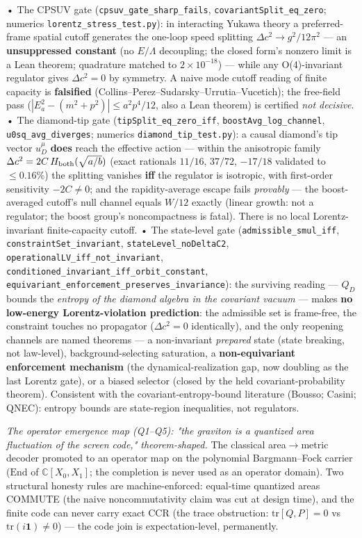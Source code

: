 \documentclass[11pt,a4paper]{article}
\begin{document}
  • The CPSUV gate (\texttt{cpsuv\_gate\_sharp\_fails}, \texttt{covariantSplit\_eq\_zero}; numerics \texttt{lorentz\_stress\_test.py}): in interacting Yukawa theory a preferred-frame spatial cutoff generates the one-loop speed splitting $\Delta c^2\to g^2/12\pi^2$ — an \textbf{unsuppressed constant} (no $E/\Lambda$ decoupling; the closed form's nonzero limit is a Lean theorem; quadrature matched to $2\times10^{-18}$) — while any O(4)-invariant regulator gives $\Delta c^2=0$ by symmetry. A naive mode cutoff reading of finite capacity is \textbf{falsified} (Collins--Perez--Sudarsky--Urrutia--Vucetich); the free-field pass ($|E_a^2-(m^2+p^2)|\le a^2p^4/12$, also a Lean theorem) is certified \emph{not decisive}.
  • The diamond-tip gate (\texttt{tipSplit\_eq\_zero\_iff}, \texttt{boostAvg\_log\_channel}, \texttt{u0sq\_avg\_diverges}; numerics \texttt{diamond\_tip\_test.py}): a causal diamond's tip vector $u^\mu_D$ \textbf{does} reach the effective action — within the anisotropic family $\Delta c^2=2C\,H_{\rm both}(\sqrt{a/b})$ (exact rationals $11/16$, $37/72$, $-17/18$ validated to $\le0.16\%$) the splitting vanishes \textbf{iff} the regulator is isotropic, with first-order sensitivity $-2C\ne0$; and the rapidity-average escape fails \emph{provably} — the boost-averaged cutoff's null channel equals $W/12$ exactly (linear growth: not a regulator; the boost group's noncompactness is fatal). There is no local Lorentz-invariant finite-capacity cutoff.
  • The state-level gate (\texttt{admissible\_smul\_iff}, \texttt{constraintSet\_invariant}, \texttt{stateLevel\_noDeltaC2}, \texttt{operationalLV\_iff\_not\_invariant}, \texttt{conditioned\_invariant\_iff\_orbit\_constant}, \texttt{equivariant\_enforcement\_preserves\_invariance}): the surviving reading — $Q_D$ bounds the \emph{entropy of the diamond algebra in the covariant vacuum} — makes \textbf{no low-energy Lorentz-violation prediction}: the admissible set is frame-free, the constraint touches no propagator ($\Delta c^2=0$ identically), and the only reopening channels are named theorems — a non-invariant \emph{prepared} state (state breaking, not law-level), background-selecting saturation, a \textbf{non-equivariant enforcement mechanism} (the dynamical-realization gap, now doubling as the last Lorentz gate), or a biased selector (closed by the held covariant-probability theorem). Consistent with the covariant-entropy-bound literature (Bousso; Casini; QNEC): entropy bounds are state-region inequalities, not regulators.

\emph{The operator emergence map (Q1--Q5): "the graviton is a quantized area fluctuation of the screen code," theorem-shaped.} The classical area$\to$metric decoder promoted to an operator map on the polynomial Bargmann--Fock carrier ($\mathrm{End}$ of $\mathbb{C}[X_0,X_1]$; the completion is never used as an operator domain). Two structural honesty rules are machine-enforced: equal-time quantized areas COMMUTE (the naive noncommutativity claim was cut at design time), and the finite code can never carry exact CCR (the trace obstruction: $\mathrm{tr}[Q,P]=0$ vs $\mathrm{tr}(i\mathbf{1})\neq 0$) — the code join is expectation-level, permanently.
\end{document}
